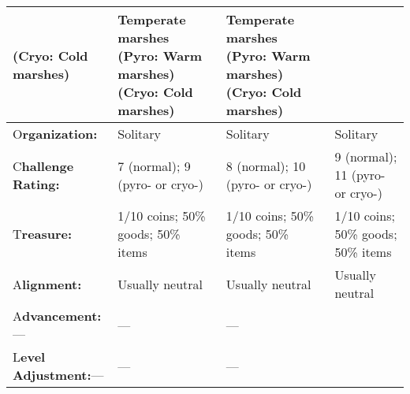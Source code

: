 \documentclass{article}
\begin{document}
\begin{tabular}{|>{\raggedright}p{51pt}|>{\raggedright}p{83pt}|>{\raggedright}p{83pt}|>{\raggedright}p{83pt}|}
(Cryo: Cold marshes) & Temperate marshes \linebreak{}
(Pyro: Warm marshes) \linebreak{}
(Cryo: Cold marshes) & Temperate marshes \linebreak{}
(Pyro: Warm marshes) \linebreak{}
(Cryo: Cold marshes)\tabularnewline
\hline
O\textbf{rganization:} & Solitary & Solitary & Solitary\tabularnewline
\hline
C\textbf{hallenge Rating:} & 7 (normal); \linebreak{}
9 (pyro- or cryo-) & 8 (normal); \linebreak{}
10 (pyro- or cryo-) & 9 (normal); \linebreak{}
11 (pyro- or cryo-)\tabularnewline
\hline
T\textbf{reasure:} & 1/10 coins; 50\% goods; 50\% items & 1/10 coins; 50\% goods; 
50\% items & 1/10 coins; 50\% goods; 50\% items\tabularnewline
\hline
A\textbf{lignment:} & Usually neutral & Usually neutral & Usually neutral\tabularnewline
\hline
A\textbf{dvancement:}--- & --- & --- & \tabularnewline
\hline
L\textbf{evel Adjustment:}--- & --- & --- & \tabularnewline
\hline
\end{tabular}
\end{document}
